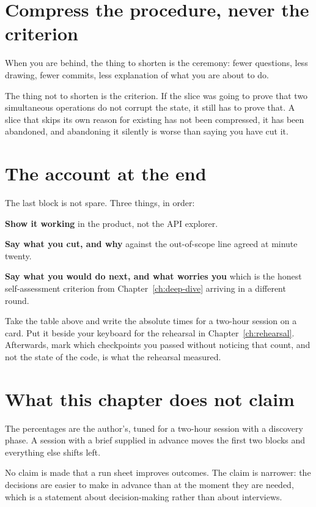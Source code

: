 
\section{Compress the procedure, never the criterion}

When you are behind, the thing to shorten is the ceremony: fewer questions,
less drawing, fewer commits, less explanation of what you are about to do.

The thing not to shorten is the criterion. If the slice was going to prove that
two simultaneous operations do not corrupt the state, it still has to prove
that. A slice that skips its own reason for existing has not been compressed,
it has been abandoned, and abandoning it silently is worse than saying you have
cut it.


\section{The account at the end}

The last block is not spare. Three things, in order:

\textbf{Show it working} \dash{} in the product, not the API explorer.

\textbf{Say what you cut, and why} \dash{} against the out-of-scope line agreed
at minute twenty.

\textbf{Say what you would do next, and what worries you} \dash{} which is the
honest self-assessment criterion from Chapter~\ref{ch:deep-dive} arriving in a
different round.

\begin{drill}
Take the table above and write the absolute times for a two-hour session on a
card. Put it beside your keyboard for the rehearsal in
Chapter~\ref{ch:rehearsal}. Afterwards, mark which checkpoints you passed
without noticing \dash{} that count, and not the state of the code, is what the
rehearsal measured.
\end{drill}

\section*{What this chapter does not claim}

The percentages are the author's, tuned for a two-hour session with a
discovery phase. A session with a brief supplied in advance moves the first two
blocks and everything else shifts left.

No claim is made that a run sheet improves outcomes. The claim is narrower: the
decisions are easier to make in advance than at the moment they are needed,
which is a statement about decision-making rather than about interviews.

